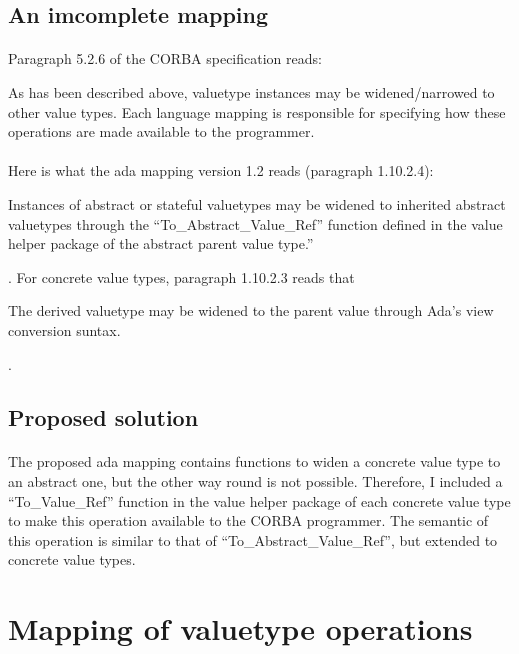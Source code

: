 \subsection{An imcomplete mapping}
\paragraph{}Paragraph 5.2.6 of the CORBA specification reads:
\begin{it}As has been described above, valuetype instances may be
widened/narrowed to other value types. Each language mapping is
responsible for specifying how these operations are made available to
the programmer.\end{it}

\paragraph{}Here is what the ada mapping version 1.2 reads (paragraph 1.10.2.4):
\begin{it}Instances of abstract or stateful valuetypes may be widened
to inherited abstract valuetypes through the
``To\_Abstract\_\-Value\_Ref'' function defined in the value helper
package of the abstract parent value type.''\end{it}. For concrete
value types, paragraph 1.10.2.3 reads that \begin{it}The derived
valuetype may be widened to the parent value through Ada's view
conversion suntax.\end{it}.

\subsection{Proposed solution}
\paragraph{}The proposed ada mapping contains functions to widen a
concrete value type to an abstract one, but the other way round is not
possible. Therefore, I included a ``To\_Value\_Ref'' function in the
value helper package of each concrete value type to make this
operation available to the CORBA programmer. The semantic of this
operation is similar to that of ``To\_Abstract\_Value\_Ref'', but
extended to concrete value types.

\section{Mapping of valuetype operations}

